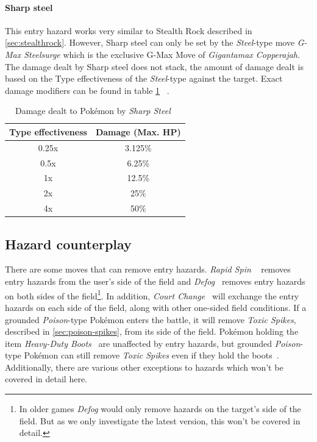 \paragraph{Sharp steel}
This entry hazard works very similar to Stealth Rock described in \ref{sec:stealthrock}.
However, Sharp steel can only be set by the \textit{Steel}-type move
\textit{G-Max Steelsurge} which is the exclusive G-Max Move of \textit{Gigantamax Copperajah}.
The damage dealt by Sharp steel does not stack, the amount of damage dealt is
based on the Type effectiveness of the \textit{Steel}-type against the target.
Exact damage modifiers can be found in table \ref{tab:sharp-steel-damage}
~\autocite{Bulbapedia:GMaxSteelsurge}.
\begin{table}[h]
	\centering
	\begin{tabular}{|c|c|}
		\hline
		\textbf{Type effectiveness} & \textbf{Damage (Max. \ac{HP}}) \\
		\hline 
		0.25x & 3.125\% \\ 
		\hline 
		0.5x &  6.25\% \\ 
		\hline 
		1x & 12.5\% \\
		\hline
		2x & 25\% \\
		\hline
		4x & 50\% \\
		\hline
	\end{tabular} 
	\caption{Damage dealt to Pokémon by \textit{Sharp Steel}~\autocite{Bulbapedia:GMaxSteelsurge}}
	\label{tab:sharp-steel-damage}
\end{table}

\subsection{Hazard counterplay}
There are some moves that can remove entry hazards. \textit{Rapid Spin} 
~\autocite{Bulbapedia:RapidSpin} removes entry hazards from the user's side of the field and
\textit{Defog}~\autocite{Bulbapedia:Defog} removes entry hazards on both sides of the 
field\footnote{In older games \textit{Defog} would only remove hazards on the
target's side of the field. But as we only investigate the latest version, this
won't be covered in detail.}. In addition, 
\textit{Court Change}~\autocite{Bulbapedia:CourtChange} will exchange the entry hazards
on each side of the field, along with other one-sided field conditions.
If a grounded
\textit{Poison}-type Pokémon enters the battle, it will remove \textit{Toxic 
Spikes}, described in \ref{sec:poison-spikes}, from its side of the field.
Pokémon holding the item 
\textit{Heavy-Duty Boots}~\autocite{Bulbapedia:HeavyDutyBoots} are unaffected by
entry hazards, but grounded \textit{Poison}-type Pokémon can still remove
\textit{Toxic Spikes} even if they hold the boots~\autocite{Bulbapedia:EntryHazards}.
Additionally, there are various other exceptions to hazards which won't be covered in detail here.

